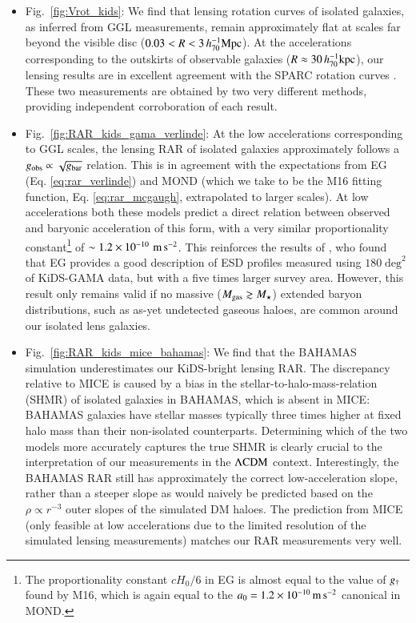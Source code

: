 \documentclass{aa}
\newcommand{\hkpc}{\,h_{70}^{-1}{\rm{kpc}} }
\newcommand{\hMpc}{\,h_{70}^{-1}{\rm{Mpc}} }
\newcommand{\mpss}{\,{\rm m}\,{\rm s}^{-2} }
\newcommand{\lcdm}{{\rm \Lambda CDM}}
\newcommand*{\E}[1]{\times 10^{#1}}
\newcommand{\un}[1]{_{\rm #1}}
\begin{document}
\begin{itemize}
	
	\item Fig.~\ref{fig:Vrot_kids}: We find that lensing rotation curves of isolated galaxies, as inferred from GGL measurements, remain approximately flat at scales far beyond the visible disc ($0.03 < R < 3 \hMpc$). At the accelerations corresponding to the outskirts of observable galaxies ($R \approx 30\hkpc$), our lensing results are in excellent agreement with the SPARC rotation curves \mbox{\cite[]{lelli2016b}}. These two measurements are obtained by two very different methods, providing independent corroboration of each result.
	
	\item Fig.~\ref{fig:RAR_kids_gama_verlinde}: At the low accelerations corresponding to GGL scales, the lensing RAR of isolated galaxies approximately follows a $g\un{obs} \propto \sqrt{g\un{bar}}$ relation. This is in agreement with the expectations from EG (Eq. \ref{eq:rar_verlinde}) and MOND (which we take to be the M16 fitting function, Eq. \ref{eq:rar_mcgaugh}, extrapolated to larger scales). At low accelerations both these models predict a direct relation between observed and baryonic acceleration of this form, with a very similar proportionality constant\footnote{The proportionality constant $c H_0 / 6$ in EG is almost equal to the value of $g\un{\dagger}$ found by M16, which is again equal to the $a_0=1.2\E{-10} \mpss$ canonical in MOND.} of $\sim1.2\E{-10} \, \mpss$. This reinforces the results of \cite{brouwer2017}, who found that EG provides a good description of ESD profiles measured using $180 \deg^2$ of KiDS-GAMA data, but with a five times larger survey area. However, this result only remains valid if no massive ($M\un{gas} \gtrsim M_\star$) extended baryon distributions, such as as-yet undetected gaseous haloes, are common around our isolated lens galaxies.
	
	\item Fig.~\ref{fig:RAR_kids_mice_bahamas}: We find that the BAHAMAS simulation underestimates our KiDS-bright lensing RAR. The discrepancy relative to MICE is caused by a bias in the stellar-to-halo-mass-relation (SHMR) of isolated galaxies in BAHAMAS, which is absent in MICE: BAHAMAS galaxies have stellar masses typically three times higher at fixed halo mass than their non-isolated counterparts. Determining which of the two models more accurately captures the true SHMR is clearly crucial to the interpretation of our measurements in the $\lcdm$ context. Interestingly, the BAHAMAS RAR still has approximately the correct low-acceleration slope, rather than a steeper slope as would naively be predicted based on the $\rho\propto r^{-3}$ outer slopes of the simulated DM haloes. The prediction from MICE (only feasible at low accelerations due to the limited resolution of the simulated lensing measurements) matches our RAR measurements very well.
	

\end{itemize}
\end{document}
